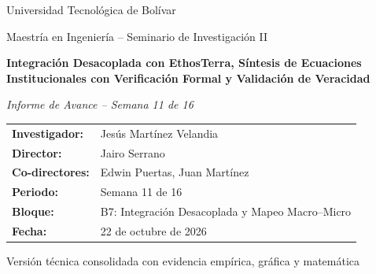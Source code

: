 \documentclass[11pt,a4paper]{article}
\begin{document}
\begin{titlepage}
    \thispagestyle{empty}
    \centering
    \vspace*{1.5cm}

    {\large Universidad Tecnol\'ogica de Bol\'ivar\par}
    \vspace{0.3cm}
    {\normalsize Maestr\'ia en Ingenier\'ia -- Seminario de Investigaci\'on II\par}

    \vspace{2.0cm}
    {\LARGE\bfseries Integraci\'on Desacoplada con EthosTerra, S\'intesis de Ecuaciones Institucionales con Verificaci\'on Formal y Validaci\'on de Veracidad\par}

    \vspace{0.8cm}
    {\large\itshape Informe de Avance -- Semana 11 de 16\par}

    \vspace{2.2cm}
    \begin{tabular}{ll}
        \textbf{Investigador:} & Jes\'us Mart\'inez Velandia \\
        \textbf{Director:} & Jairo Serrano \\
        \textbf{Co-directores:} & Edwin Puertas, Juan Mart\'inez \\
        \textbf{Periodo:} & Semana 11 de 16 \\
        \textbf{Bloque:} & B7: Integraci\'on Desacoplada y Mapeo Macro--Micro \\
        \textbf{Fecha:} & 22 de octubre de 2026 \\
    \end{tabular}

    \vfill
    {\small Versi\'on t\'ecnica consolidada con evidencia emp\'irica, gr\'afica y matem\'atica\par}
    \vspace*{1.0cm}
\end{titlepage}

\clearpage
\hypersetup{pageanchor=true}
\setcounter{page}{1}
\fancyfoot[C]{\small \thepage}
\tableofcontents
\clearpage

\setcounter{page}{1}
\end{document}
